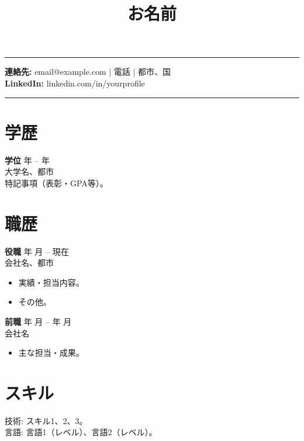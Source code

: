 \documentclass[11pt,a4paper]{article}
\title{\vspace{-1.2cm}\textbf{お名前}}
\author{}
\date{}
\begin{document}
\maketitle
\vspace{-0.8cm}
\begin{flushright}\rule{2.2cm}{2.8cm}\end{flushright}

\textbf{連絡先:} email@example.com \quad | \quad 電話 \quad | \quad 都市、国 \\
\textbf{LinkedIn:} linkedin.com/in/yourprofile

\vspace{0.4cm}
\noindent\rule{\textwidth}{0.4pt}

\section*{学歴}
\textbf{学位} \hfill 年 -- 年 \\
大学名、都市 \\
特記事項（表彰・GPA等）。

\section*{職歴}
\textbf{役職} \hfill 年 月 -- 現在 \\
会社名、都市 \\
\begin{itemize}
  \item 実績・担当内容。
  \item その他。
\end{itemize}

\textbf{前職} \hfill 年 月 -- 年 月 \\
会社名 \\
\begin{itemize}
  \item 主な担当・成果。
\end{itemize}

\section*{スキル}
技術: スキル1、2、3。 \\
言語: 言語1（レベル）、言語2（レベル）。
\end{document}

